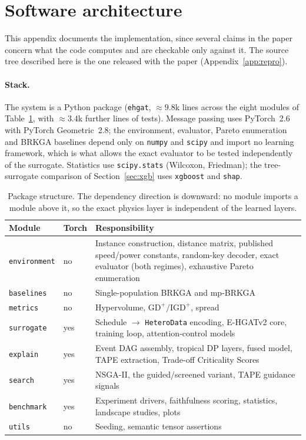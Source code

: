 \documentclass[11pt]{article}
\begin{document}
\section{Software architecture}
\label{app:software}
This appendix documents the implementation, since several claims in the paper concern what
the code computes and are checkable only against it. The source tree described here is the
one released with the paper (Appendix~\ref{app:repro}).

\paragraph{Stack.} The system is a Python package (\texttt{ehgat}, $\approx\!9.8$k lines
across the eight modules of Table~\ref{tab:modules}, with $\approx\!3.4$k further lines of
tests). Message passing uses PyTorch~2.6 with PyTorch Geometric~2.8; the environment,
evaluator, Pareto enumeration and BRKGA baselines depend only on \texttt{numpy} and
\texttt{scipy} and
import no learning framework, which is what allows the exact evaluator to be tested
independently of the surrogate. Statistics use \texttt{scipy.stats} (Wilcoxon, Friedman);
the tree-surrogate comparison of Section~\ref{sec:xgb} uses \texttt{xgboost} and
\texttt{shap}.

\begin{table}[h]
\centering
\small
\caption{Package structure. The dependency direction is downward: no module imports a module
above it, so the exact physics layer is independent of the learned layers.}
\label{tab:modules}
\begin{tabular}{@{}llp{7.1cm}@{}}
\toprule
\textbf{Module} & \textbf{Torch} & \textbf{Responsibility} \\
\midrule
\texttt{environment} & no  & Instance construction, distance matrix, published speed/power constants, random-key decoder, exact evaluator (both regimes), exhaustive Pareto enumeration \\
\texttt{baselines}   & no  & Single-population BRKGA and mp-BRKGA \\
\texttt{metrics}     & no  & Hypervolume, $\mathrm{GD}^+/\mathrm{IGD}^+$, spread \\
\texttt{surrogate}   & yes & Schedule $\to$ \texttt{HeteroData} encoding, E-HGATv2 core, training loop, attention-control models \\
\texttt{explain}     & yes & Event DAG assembly, tropical DP layers, fused model, TAPE extraction, Trade-off Criticality Scores \\
\texttt{search}      & yes & NSGA-II, the guided/screened variant, TAPE guidance signals \\
\texttt{benchmark}   & yes & Experiment drivers, faithfulness scoring, statistics, landscape studies, plots \\
\texttt{utils}       & no  & Seeding, semantic tensor assertions \\
\bottomrule
\end{tabular}
\end{table}
\end{document}
